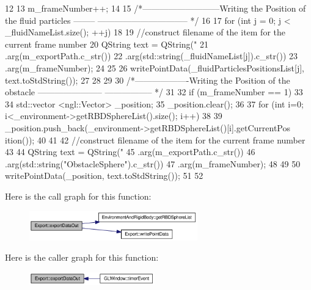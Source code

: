 \begin{DoxyCode}
12 {
13     m_frameNumber++;
14 
15 /*---------------------------Writing the Position of the fluid particles --------
      -------------------------------- */
16 
17     for (int j = 0; j < _fluidNameList.size(); ++j)
18     {
19         //construct filename of the item for the current frame number
20         QString text = QString("%
21                         .arg(m_exportPath.c_str())
22                         .arg(std::string(_fluidNameList[j]).c_str())
23                         .arg(m_frameNumber);
24 
25 
26         writePointData(_fluidParticlesPositionsList[j], text.toStdString());
27 
28     }
29 
30 /*-------------------Writing the Position of the obstacle -----------------------
      ----------------- */
31 
32     if (m_frameNumber == 1)
33     {
34         std::vector <ngl::Vector> _position;
35         _position.clear();
36 
37         for (int i=0; i<_environment->getRBDSphereList().size(); i++)
38         {
39             _position.push_back(_environment->getRBDSphereList()[i].getCurrentPos
      ition());
40         }
41 
42         //construct filename of the item for the current frame number
43 
44         QString text = QString("%
45                         .arg(m_exportPath.c_str())
46                         .arg(std::string("ObstacleSphere").c_str())
47                         .arg(m_frameNumber);
48 
49 
50         writePointData(_position, text.toStdString());
51     }
52 }
\end{DoxyCode}




Here is the call graph for this function:\nopagebreak
\begin{figure}[H]
\begin{center}
\leavevmode
\includegraphics[width=206pt]{class_export_ae3981dfddf020b1da5b91e344247977b_cgraph}
\end{center}
\end{figure}




Here is the caller graph for this function:\nopagebreak
\begin{figure}[H]
\begin{center}
\leavevmode
\includegraphics[width=154pt]{class_export_ae3981dfddf020b1da5b91e344247977b_icgraph}
\end{center}
\end{figure}


